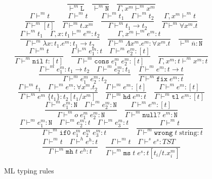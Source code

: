 \begin{figure}[p]
\[
\frac{}{\vdash^m\mathtt{L}}
\quad
\frac{}{\vdash^m\mathtt{\mathtt{N}}}
\quad
\frac{}{\Gamma,x^m\vdash^mx^m}
\]
\[
\frac{\Gamma\vdash^mt}{\Gamma\vdash^m[t]}
\quad
\frac{\Gamma\vdash^mt}{\Gamma\vdash^mt.x^m}
\quad
\frac{\Gamma\vdash^mt_{1}\quad\Gamma\vdash^mt_{2}}{\Gamma\vdash^mt_{1}\rightarrow t_{2}}
\quad
\frac{\Gamma ,x^m\vdash^mt}{\Gamma\vdash^m\forall x^m.t}
\]
\bigskip
\[
\frac{\Gamma\vdash^mt_{1}\quad\Gamma,x:t_{1}\vdash^me^m:t_{2}}{\Gamma\vdash^m\lambda x:t_{1}.e^m:t_{1}\rightarrow t_{2}}
\quad
\frac{\Gamma,x^m\vdash^me^m:t}{\Gamma\vdash^m\Lambda x^m.e^m:\forall x^m.t}
\quad
\frac{}{\vdash^m\overline{n}:\mathtt{N}}
\]
\[
\frac{\Gamma\vdash^mt}{\Gamma\vdash^m\mathtt{nil}\;t:[t]}
\quad
\frac{\Gamma\vdash^me^m_1:t\quad\Gamma\vdash^me^m_2:[t]}{\Gamma\vdash^m\mathtt{cons}\;e^m_1\;e^m_2:[t]}
\quad
\frac{}{\Gamma,x^m:t\vdash^mx^m:t}
\]
\[
\frac{\Gamma\vdash^me^m_1:t_{1}\rightarrow t_{2}\quad\Gamma\vdash^me^m_2:t_{1}}{\Gamma\vdash^me^m_1\;e^m_2:t_{2}}
\quad
\frac{\Gamma\vdash^me^m:t\rightarrow t}{\Gamma\vdash^m\mathtt{fix}\;e^m:t}
\]
\[
\frac{\Gamma\vdash^mt_{1}\quad\Gamma\vdash^me^m:\forall x^m.t_{2}}{\Gamma\vdash^me^m\;\lbrace t_{1}\rbrace:t_{2}[t_{1}/x^m]}
\quad
\frac{\Gamma\vdash^me^m:[t]}{\Gamma\vdash^m\mathtt{hd}\;e^m:t}
\quad
\frac{\Gamma\vdash^me^m:[t]}{\Gamma\vdash^m\mathtt{tl}\;e^m:[t]}
\]
\[
\frac{\Gamma\vdash^me^m_1:\mathtt{N}\quad\Gamma\vdash^me^m_2:\mathtt{N}}{\Gamma\vdash^mo\;e^m_1\;e^m_2:\mathtt{N}}
\quad
\frac{\Gamma\vdash^me^m:[t]}{\Gamma\vdash^m\mathtt{null?}\;e^m:\mathtt{N}}
\]
\[
\frac{\Gamma\vdash^me^m_1:\mathtt{N}\quad\Gamma\vdash^me^m_2:t\quad\Gamma\vdash^me^m_3:t}{\Gamma\vdash^m\mathtt{if0}\;e^m_1\;e^m_2\;e^m_3:t}
\quad
\frac{\Gamma\vdash^mt}{\Gamma\vdash^m\mathtt{wrong}\;t\;\mathrm{string}:t}
\]
\[
\frac{\Gamma\vdash^mt\quad\Gamma\vdash^he^h:t}{\Gamma\vdash^m\mathtt{mh}\;t\;e^h:t}
\quad
\frac{\Gamma\vdash^mt\quad\Gamma\vdash^se^s:TST}{\Gamma\vdash^m\mathtt{ms}\;t\;e^s:t[t_{i}/t.x^m_{i}]}
\]
\caption{ML typing rules}
\label{mtr}
\end{figure}